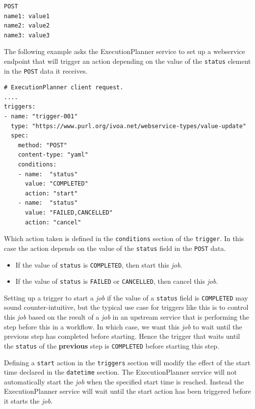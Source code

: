 \documentclass[11pt,a4paper]{ivoa}
\newcommand{\webservice} {webservice}
\newcommand{\execplanner} {ExecutionPlanner}
\newcommand{\codeword}[1] {\texttt{#1}}
\newcommand{\job} {\textit{job}}
\begin{document}
\begin{lstlisting}[]
POST
name1: value1
name2: value2
name3: value3
\end{lstlisting}

The following example asks the \execplanner{} service to set up a \webservice{} endpoint
that will trigger an action depending on the value of the \codeword{status}
element in the \codeword{POST} data it receives.

\begin{lstlisting}[]
# ExecutionPlanner client request.
....
triggers:
- name: "trigger-001"
  type: "https://www.purl.org/ivoa.net/webservice-types/value-update"
  spec:
    method: "POST"
    content-type: "yaml"
    conditions:
    - name:  "status"
      value: "COMPLETED"
      action: "start"
    - name:  "status"
      value: "FAILED,CANCELLED"
      action: "cancel"
\end{lstlisting}

Which action taken is defined in the \codeword{conditions} section of the \codeword{trigger}.
In this case the action depends on the value of the \codeword{status} field in the \codeword{POST} data.
\begin{itemize}
    \item If the value of \codeword{status} is \codeword{COMPLETED}, then start this \job{}.
    \item If the value of \codeword{status} is \codeword{FAILED} or \codeword{CANCELLED}, then cancel this \job{}.
\end{itemize}

Setting up a trigger to start a \job{} if the value of a \codeword{status} field is \codeword{COMPLETED}
may sound counter-intuitive, but the typical use case for triggers like this is to
control this \job{} based on the result of a \job{} in an upstream service that is performing the
step before this in a workflow.
In which case, we want this \job{} to wait until the previous step has completed before starting.
Hence the trigger that waits until the \codeword{status} of the \textbf{previous} step is
\codeword{COMPLETED} before starting this step.

Defining a \codeword{start} action in the \codeword{triggers} section will modify the effect of the
start time declared in the \codeword{datetime} section.
The \execplanner{} service will not automatically start the \job{} when the specified start time is reached.
Instead the \execplanner{} service will wait until the start action has been triggered before it starts the \job{}.
\end{document}
